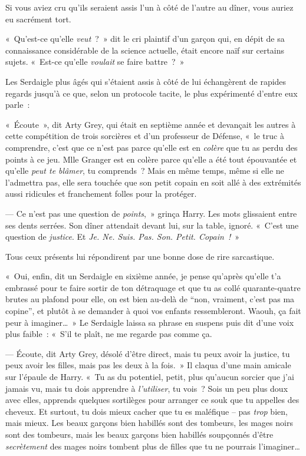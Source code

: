 \later

Si vous aviez cru qu'ils seraient assis l'un à côté de l'autre au dîner, vous auriez eu sacrément tort.

«~Qu'est-ce qu'elle \emph{veut}~?~» dit le cri plaintif d'un garçon qui, en dépit de sa connaissance considérable de la science actuelle, était encore naïf sur certains sujets. «~Est-ce qu'elle \emph{voulait} se faire battre~?~»

Les Serdaigle plus âgés qui s'étaient assis à côté de lui échangèrent de rapides regards jusqu'à ce que, selon un protocole tacite, le plus expérimenté d'entre eux parle~:

«~Écoute~», dit Arty Grey, qui était en septième année et devançait les autres à cette compétition de trois sorcières et d'un professeur de Défense, «~le truc à comprendre, c'est que ce n'est pas parce qu'elle est en \emph{colère} que tu as perdu des points à ce jeu. Mlle Granger est en colère parce qu'elle a été tout épouvantée et qu'elle \emph{peut te blâmer}, tu comprends~? Mais en même temps, même si elle ne l'admettra pas, elle sera touchée que son petit copain en soit allé à des extrémités aussi ridicules et franchement folles pour la protéger.

--- Ce n'est pas une question de \emph{points},~» grinça Harry. Les mots glissaient entre ses dents serrées. Son dîner attendait devant lui, sur la table, ignoré. «~C'est une question de \emph{justice}. Et \emph{Je. Ne. Suis. Pas. Son. Petit. Copain~!}~»

Tous ceux présents lui répondirent par une bonne dose de rire sarcastique.

«~Oui, enfin, dit un Serdaigle en sixième année, je pense qu'après qu'elle t'a embrassé pour te faire sortir de ton détraquage et que tu as collé quarante-quatre brutes au plafond pour elle, on est bien au-delà de “non, vraiment, c'est pas ma copine”, et plutôt à se demander à quoi vos enfants ressembleront. Waouh, ça fait peur à imaginer…~» Le Serdaigle laissa sa phrase en suspens puis dit d'une voix plus faible~: «~S'il te plaît, ne me regarde pas comme ça.

--- Écoute, dit Arty Grey, désolé d'être direct, mais tu peux avoir la justice, tu peux avoir les filles, mais pas les deux à la fois.~» Il claqua d'une main amicale sur l'épaule de Harry. «~Tu as du potentiel, petit, plus qu'aucun sorcier que j'ai jamais vu, mais tu dois apprendre à \emph{l'utiliser}, tu vois~? Sois un peu plus doux avec elles, apprends quelques sortilèges pour arranger ce souk que tu appelles des cheveux. Et surtout, tu dois mieux cacher que tu es maléfique -- pas \emph{trop} bien, mais mieux. Les beaux garçons bien habillés sont des tombeurs, les mages noirs sont des tombeurs, mais les beaux garçons bien habillés soupçonnés d'être \emph{secrètement} des mages noirs tombent plus de filles que tu ne pourrais l'imaginer…

